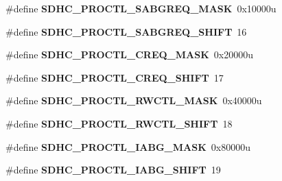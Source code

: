 \begin{DoxyCompactItemize}
\item 
\#define {\bfseries S\+D\+H\+C\+\_\+\+P\+R\+O\+C\+T\+L\+\_\+\+S\+A\+B\+G\+R\+E\+Q\+\_\+\+M\+A\+SK}~0x10000u\hypertarget{group__SDHC__Register__Masks_gab4bb75efee8a2303ff47f441630f7d3f}{}\label{group__SDHC__Register__Masks_gab4bb75efee8a2303ff47f441630f7d3f}

\item 
\#define {\bfseries S\+D\+H\+C\+\_\+\+P\+R\+O\+C\+T\+L\+\_\+\+S\+A\+B\+G\+R\+E\+Q\+\_\+\+S\+H\+I\+FT}~16\hypertarget{group__SDHC__Register__Masks_ga124dcc1ca07a3d3e8600609fa80d9496}{}\label{group__SDHC__Register__Masks_ga124dcc1ca07a3d3e8600609fa80d9496}

\item 
\#define {\bfseries S\+D\+H\+C\+\_\+\+P\+R\+O\+C\+T\+L\+\_\+\+C\+R\+E\+Q\+\_\+\+M\+A\+SK}~0x20000u\hypertarget{group__SDHC__Register__Masks_ga6278901eea66f3db196739c4dc820644}{}\label{group__SDHC__Register__Masks_ga6278901eea66f3db196739c4dc820644}

\item 
\#define {\bfseries S\+D\+H\+C\+\_\+\+P\+R\+O\+C\+T\+L\+\_\+\+C\+R\+E\+Q\+\_\+\+S\+H\+I\+FT}~17\hypertarget{group__SDHC__Register__Masks_ga8b783b0ab48e4f66cafa6fc7da38cfbb}{}\label{group__SDHC__Register__Masks_ga8b783b0ab48e4f66cafa6fc7da38cfbb}

\item 
\#define {\bfseries S\+D\+H\+C\+\_\+\+P\+R\+O\+C\+T\+L\+\_\+\+R\+W\+C\+T\+L\+\_\+\+M\+A\+SK}~0x40000u\hypertarget{group__SDHC__Register__Masks_gadefa120c89ff122b91a0fda6b551930a}{}\label{group__SDHC__Register__Masks_gadefa120c89ff122b91a0fda6b551930a}

\item 
\#define {\bfseries S\+D\+H\+C\+\_\+\+P\+R\+O\+C\+T\+L\+\_\+\+R\+W\+C\+T\+L\+\_\+\+S\+H\+I\+FT}~18\hypertarget{group__SDHC__Register__Masks_ga3ba901ecf6267198e180a9299b4c430c}{}\label{group__SDHC__Register__Masks_ga3ba901ecf6267198e180a9299b4c430c}

\item 
\#define {\bfseries S\+D\+H\+C\+\_\+\+P\+R\+O\+C\+T\+L\+\_\+\+I\+A\+B\+G\+\_\+\+M\+A\+SK}~0x80000u\hypertarget{group__SDHC__Register__Masks_ga837bace762b865593415b31c06dbf5c4}{}\label{group__SDHC__Register__Masks_ga837bace762b865593415b31c06dbf5c4}

\item 
\#define {\bfseries S\+D\+H\+C\+\_\+\+P\+R\+O\+C\+T\+L\+\_\+\+I\+A\+B\+G\+\_\+\+S\+H\+I\+FT}~19\hypertarget{group__SDHC__Register__Masks_gaf62ddb022a19e9fe0ce3d39eeffadd4a}{}\label{group__SDHC__Register__Masks_gaf62ddb022a19e9fe0ce3d39eeffadd4a}


\end{DoxyCompactItemize}
